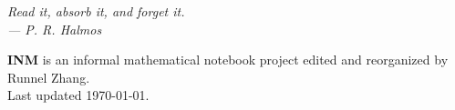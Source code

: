 
\begin{titlepage}
\vspace*{3cm}
\begin{flushright}
\large\itshape
Read it, absorb it, and forget it.\\[0.8cm]
--- P. R. Halmos
\end{flushright}
\vfill
{\small
\noindent \textbf{INM} is an informal mathematical notebook project edited and reorganized by Runnel Zhang.\\[0.4cm]
\noindent Last updated \today.
}
\end{titlepage}
